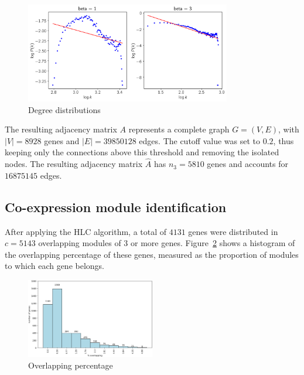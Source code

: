 \documentclass[12pt,journal, onecolumn]{IEEEtran}
\begin{document}
\begin{figure}[h]
  \centering
    \includegraphics[clip,width=0.8\textwidth]{Figures/pick_beta.png}
  \caption{Degree distributions}
  \label{fig:beta}
\end{figure}

The resulting adjacency matrix $A$ represents a complete graph $G=(V,E)$, with $|V| = 8928$ genes and $|E| = 39850128$ edges. The cutoff value was set to $0.2$, thus keeping only the connections above this threshold and removing the isolated nodes. The resulting adjacency matrix $\hat{A}$ has $n_3 = 5810$ genes and accounts for $16875145$ edges.\\


\subsection{Co-expression module identification}
After applying the HLC algorithm, a total of $4131$ genes were distributed in $c = 5143$ overlapping modules of $3$ or more genes. Figure~\ref{fig:overlap} shows a histogram of the overlapping percentage of these genes, measured as the proportion of modules to which each gene belongs.

\begin{figure}[h]
  \centering
    \includegraphics[clip,width=0.5\textwidth]{Figures/artificial_modules.png}
  \caption{Overlapping percentage}
  \label{fig:overlap}
\end{figure}
\end{document}
